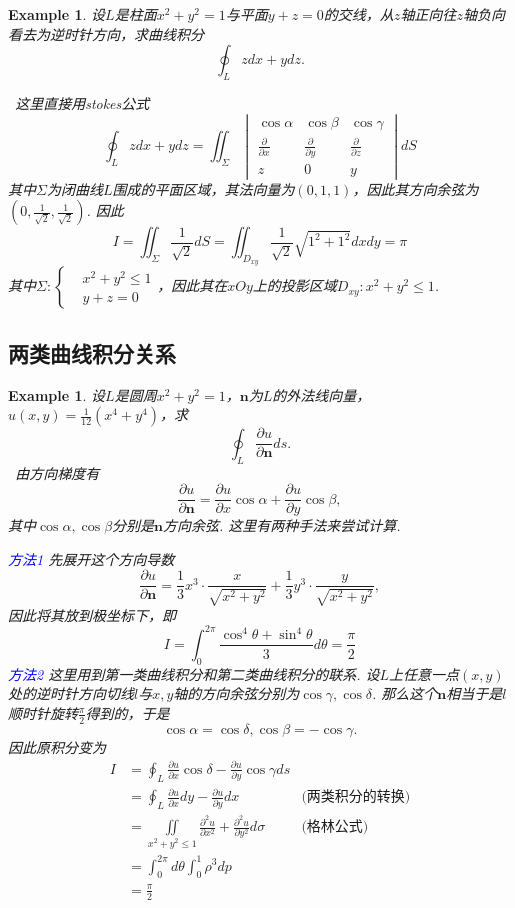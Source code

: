 \documentclass{article}
\newtheorem{example}[theorem]{Example}
\newcommand{\hints}{{\color{blue} \text{hints}}}
\newcommand{\bluet}[1]{\textcolor{blue}{#1}}
\begin{document}
\begin{example}
\rm 设$L$是柱面$x^2+y^2=1$与平面$y+z=0$的交线，从$z$轴正向往$z$轴负向看去为逆时针方向，求曲线积分
$$
\oint_L zdx + ydz.
$$

\hints\ 这里直接用stokes公式
$$
\oint_L zdx + ydz = \iint_\Sigma \begin{vmatrix}
\cos \alpha & \cos \beta & \cos \gamma \\
\frac{\partial}{\partial x} & \frac{\partial}{\partial y} & \frac{\partial}{\partial z} \\
z & 0 & y 
\end{vmatrix}dS
$$
其中$\Sigma$为闭曲线$L$围成的平面区域，其法向量为$(0,1,1)$，因此其方向余弦为$(0,\frac{1}{\sqrt{2}},\frac{1}{\sqrt{2}})$. 因此
$$
I = \iint_\Sigma \frac{1}{\sqrt{2}}dS=  \iint_{D_{xy}} \frac{1}{\sqrt{2}} \sqrt{1^2 + 1^2}dxdy = \pi
$$
其中$\Sigma: \left\{ \begin{aligned} &x^2+y^2 \leq 1 \\ &y+z = 0  \end{aligned} \right.$，因此其在$xOy$上的投影区域$D_{xy}: x^2+y^2 \leq 1$. 
\end{example}

\subsection{两类曲线积分关系}

\begin{example}
\rm 设$L$是圆周$x^2 + y^2 = 1$，$\bm{n}$为$L$的外法线向量，$u(x,y) = \frac{1}{12}(x^4 + y^4)$，求
$$
\oint_L \frac{\partial u}{\partial \bm{n}}ds.
$$
\hints\ 由方向梯度有
$$
\frac{\partial u}{\partial \bm{n}} = \frac{\partial u}{\partial x}\cos\alpha + \frac{\partial u}{\partial y}\cos \beta,
$$
其中$\cos\alpha,\cos\beta$分别是$\bm{n}$方向余弦. 这里有两种手法来尝试计算.  

\bluet{方法1} 先展开这个方向导数
$$
\frac{\partial u}{\partial \bm{n}} = \frac{1}{3}x^3\cdot \frac{x}{\sqrt{x^2+y^2}}+ \frac{1}{3}y^3 \cdot \frac{y}{\sqrt{x^2+y^2}},
$$
因此将其放到极坐标下，即
$$
I = \int_{0}^{2\pi} \frac{\cos^4\theta + \sin^4\theta}{3}d\theta = \frac{\pi}{2}
$$
\bluet{方法2} 这里用到第一类曲线积分和第二类曲线积分的联系. 设$L$上任意一点$(x,y)$处的逆时针方向切线$l$与$x,y$轴的方向余弦分别为$\cos\gamma,\cos\delta$. 那么这个$\bm{n}$相当于是$l$顺时针旋转$\frac{\pi}{2}$得到的，于是
$$
\cos\alpha = \cos\delta, \cos\beta = -\cos\gamma.
$$
因此原积分变为
$$
\begin{aligned}
I  &= \oint_L \frac{\partial u}{\partial x}\cos\delta -\frac{\partial u}{\partial y}\cos\gamma ds \\
&= \oint_L\frac{\partial u}{\partial x}dy -\frac{\partial u}{\partial y}dx & \text{(两类积分的转换)} \\
&= \iint\limits_{x^2 + y^2 \leq 1} \frac{\partial^2 u}{\partial x^2} + \frac{\partial^2 u}{\partial y^2}d\sigma & \text{(格林公式)} \\
&= \int_{0}^{2\pi}d\theta \int_0^1 \rho^3dp \\
&= \frac{\pi}{2}
\end{aligned}
$$
\end{example}
\end{document}
